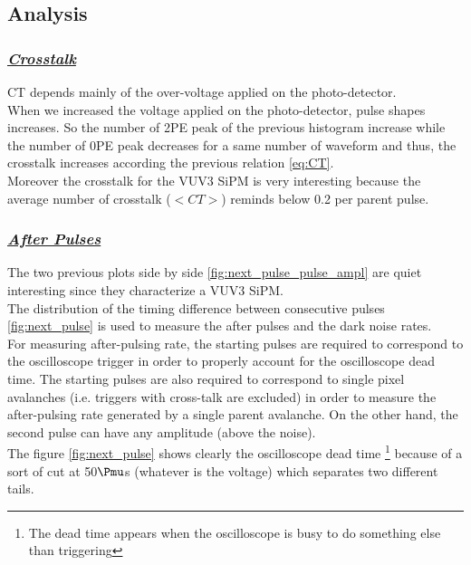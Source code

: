 \documentclass[a4paper, 11pt]{report}%
\begin{document}
  \subsection{Analysis}
  
  \subsubsection{\underline{\textit{Crosstalk}}}
  
  CT depends mainly of the over-voltage applied on the photo-detector.\\
  When we increased the voltage applied on the photo-detector, pulse shapes increases. So the number of 2PE peak of the previous 
  histogram increase while the number of 0PE peak decreases for a same number of waveform and thus, the crosstalk increases according 
  the previous relation \ref{eq:CT}.\\
  Moreover the crosstalk for the VUV3 SiPM is 
  very interesting because the average number of crosstalk ($<CT>$) reminds below 0.2 per parent pulse.
  
  \subsubsection{\underline{\textit{After Pulses}}}
  
  The two previous plots side by side \ref{fig:next_pulse_pulse_ampl} are quiet interesting since they characterize a VUV3 SiPM.
  \\
  
  The distribution of the timing difference between consecutive pulses \ref{fig:next_pulse} is used to measure the after pulses and 
  the dark noise rates.
  \\
  
  For measuring after-pulsing rate, the starting pulses are required to correspond to the oscilloscope trigger in order to properly
  account for the oscilloscope dead time. The starting pulses are also required to correspond to single pixel avalanches
  (i.e. triggers with cross-talk are excluded) in order to measure the after-pulsing rate generated by a single parent 
  avalanche.
  On the other hand, the second pulse can have any amplitude (above the noise).\\
  The figure \ref{fig:next_pulse} shows clearly the oscilloscope dead time \footnote{The dead time appears when the 
  oscilloscope is busy to do something else than triggering} because of a sort of cut at 50$\Pmu$s 
  (whatever is the voltage) 
  which separates two different tails.
  \\
  
\end{document}
